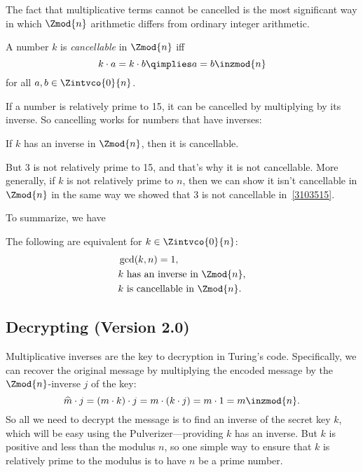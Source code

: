 The fact that multiplicative terms cannot be cancelled is the most
significant way in which $\Zmod{n}$ arithmetic differs from ordinary
integer arithmetic.

\begin{definition}
A number $k$ is \emph{cancellable} in $\Zmod{n}$ iff
\[
k \cdot a = k \cdot b  \qimplies a = b  \inzmod{n}
\]
for all $a,b \in \Zintvco{0}{n}$.
\end{definition}

If a number is relatively prime to 15, it can be cancelled by
multiplying by its inverse.  So cancelling works for numbers that have
inverses:
\begin{lemma}\label{lem:cancellation-arb}
If $k$ has an inverse in $\Zmod{n}$, then it is cancellable.
\end{lemma}

But 3 is not relatively prime to 15, and that's why it is not
cancellable.  More generally, if $k$ is not relatively prime to $n$,
then we can show it isn't cancellable in $\Zmod{n}$ in the same way we
showed that 3 is not cancellable in~\eqref{3103515}.

\iffalse
Namely, suppose $\gcd(k,n) = m > 1$.  So $k/m$ and $n/m$ are
positive integers, and we have
\begin{align*}
          (n/m) \cdot k & = n \cdot (k/m),\\
\rem{(n/m) \cdot k}{n} & = \rem{n \cdot (k/m)}{n},\\
        (n/m) \cdot k & = 0 = 0 \cdot k \inzmod{n}.
\end{align*}
Now $k$ can't be cancelled or we would reach the false conclusion that
$n/m = 0$.
\fi

To summarize, we have
\begin{theorem}\label{thm:mod_inverses}
The following are equivalent for $k \in \Zintvco{0}{n}$:
\begin{align*}
& \gcd(k, n) = 1,\\
& k \text{ has an inverse in $\Zmod{n}$},\\
& k \text{ is cancellable in $\Zmod{n}$}.
\end{align*}
\end{theorem}

\subsection{Decrypting (Version 2.0)}

Multiplicative inverses are the key to decryption in Turing's code.
Specifically, we can recover the original message by multiplying the
encoded message by the $\Zmod{n}$-inverse $j$ of the key:
\[
\widehat{m} \cdot j = (m \cdot k) \cdot j = m \cdot (k \cdot j) = m \cdot 1 = m \inzmod{n}.
\]
So all we need to decrypt the message is to find an inverse of the
secret key $k$, which will be easy using the Pulverizer---providing
$k$ has an inverse.  But $k$ is positive and less than the modulus
$n$, so one simple way to ensure that $k$ is relatively prime to the
modulus is to have $n$ be a prime number.

